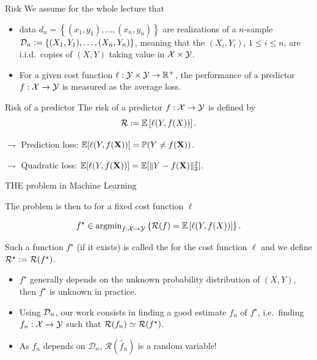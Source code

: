 \documentclass[xcolor={usenames,dvipsnames},handout]{beamer}
\begin{document}
\begin{frame}{Risk}
We assume for the whole lecture that 
\begin{itemize}
\item data $d_n = \left\{ (x_1,y_1) , \hdots , (x_n, y_n) \right\}$ are realizations of a $n$-sample ${\mathcal{D}}_n := \left\{ (X_1,Y_1) , \hdots , (X_n, Y_n)\right\}$, meaning that the \alert{$(X_i,Y_i)$, $1\leq i \leq n$, are i.i.d.\ copies of $(X,Y)$} taking value in ${\mathcal{X}}\times {\mathcal{Y}}$.

\item For a given cost function $\ell : {\mathcal{Y}} \times {\mathcal{Y}} \to \mathbb{R}^+$, the performance of  a predictor $f : {\mathcal{X}} \to {\mathcal{Y}}$ is measured as the \alert{average loss}.
\end{itemize}

\begin{exampleblock}{Risk of a predictor}
The risk of a predictor $f : {\mathcal{X}} \to {\mathcal{Y}}$ is defined by
$$
{\mathcal{R}} := \mathbb{E} \left[ \ell(Y,f(X)) \right].
$$
\end{exampleblock}


\vspace{.2cm}

$\rightharpoondown$ \alert{Prediction} loss: $\mathbb{E}[\ell(Y,f(\textbf{X}))]=\mathbb{P}(Y\neq f(\textbf{X}))$.

$\rightharpoondown$ \alert{Quadratic} loss: $\mathbb{E}[\ell(Y,f(\textbf{X}))]=\mathbb{E}[\|Y-f(\textbf{X})\|_2^2]$.

\end{frame}

\begin{frame}{THE problem in Machine Learning}


The problem is then to  for a fixed cost function $\ell$
\begin{block}{}
$$
f^\star \in \operatorname{argmin}_{f:{\mathcal{X}}\to{\mathcal{Y}}} \left\{{\mathcal{R}}(f)= \mathbb{E} \left[ \ell(Y,f(X)) \right]\right\}.
$$
\end{block}
Such a function $f^\star$ (if it exists) is called the  for the cost function $\ell$ and \alert{we define ${\mathcal{R}}^\star :={\mathcal{R}}(f^\star)$}.

\vspace{.2cm}

\begin{itemize}
\item  $f^\star$ generally depends on the unknown probability distribution of $(X,Y)$, then \alert{$f^\star$ is unknown in practice}.
\item Using ${\mathcal{D}}_n$, our work consists in finding a good estimate $f_n$ of $f^\star$, i.e.\ finding $f_n:{\mathcal{X}}\to{\mathcal{Y}}$ such that ${\mathcal{R}}(f_n)\simeq {\mathcal{R}}(f^\star)$. 
\item  As $f_n$ depends on $\mathcal{D}_n$, \alert{$\mathcal{R}(\widehat{f}_n)$ is a random variable}!
\end{itemize}
\end{frame}
\end{document}
